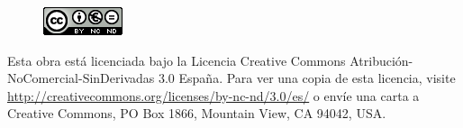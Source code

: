 \vspace{1cm}
\begin{figure}[H]
    \centering
	\includegraphics[scale=1]{./imagenes/license.png}
\end{figure}
Esta obra está licenciada bajo la Licencia Creative Commons Atribución-NoComercial-SinDerivadas 3.0 España. 
Para ver una copia de esta licencia, visite \href{http://creativecommons.org/licenses/by-nc-nd/3.0/es/}{http://creativecommons.org/licenses/by-nc-nd/3.0/es/} 
o envíe una carta a Creative Commons, PO Box 1866, Mountain View, CA 94042, USA.